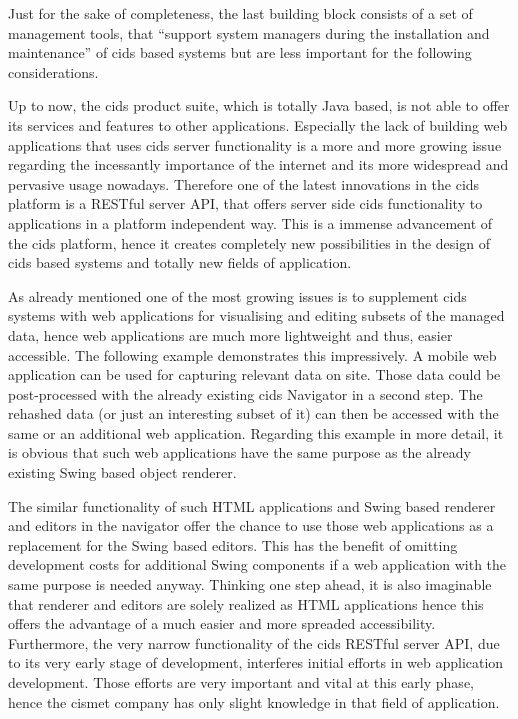Just for the sake of completeness, the last building block consists of a set of management tools, that ``support system managers during the installation and maintenance'' \autocite[]{cismet-cids-readMe} of cids based systems but are less important for the following considerations.

Up to now, the cids product suite, which is totally Java based, is not able to offer its services and features to other applications.
Especially the lack of building web applications that uses cids server functionality is a more and more growing issue regarding the incessantly importance of the internet and its more widespread and pervasive usage nowadays.
Therefore one of the latest innovations in the cids platform is a RESTful server API, that offers server side cids functionality to applications in a platform independent way.
This is a immense advancement of the cids platform, hence it creates completely new possibilities in the design of cids based systems and totally new fields of application.


As already mentioned one of the most growing issues is to supplement cids systems with web applications for visualising and editing subsets of the managed data, hence web applications are much more lightweight and thus, easier accessible.
The following example demonstrates this impressively.
A mobile web application can be used for capturing relevant data on site.
Those data could be post-processed with the already existing cids Navigator in a second step.
The rehashed data (or just an interesting subset of it) can then be accessed with the same or an additional web application.
Regarding this example in more detail, it is obvious that such web applications have the same purpose as the already existing Swing based object renderer.

The similar functionality of such HTML applications and Swing based renderer and editors in the navigator offer the chance to use those web applications as a replacement for the Swing based editors.
This has the benefit of omitting development costs for additional Swing components if a web application with the same purpose is needed anyway.
Thinking one step ahead, it is also imaginable that renderer and editors are solely realized as HTML applications hence this offers the advantage of a much easier and more spreaded accessibility.
Furthermore, the very narrow functionality of the cids RESTful server API, due to its very early stage of development, interferes initial efforts in web application development.
Those efforts are very important and vital at this early phase, hence the cismet company has only slight knowledge in that field of application.

